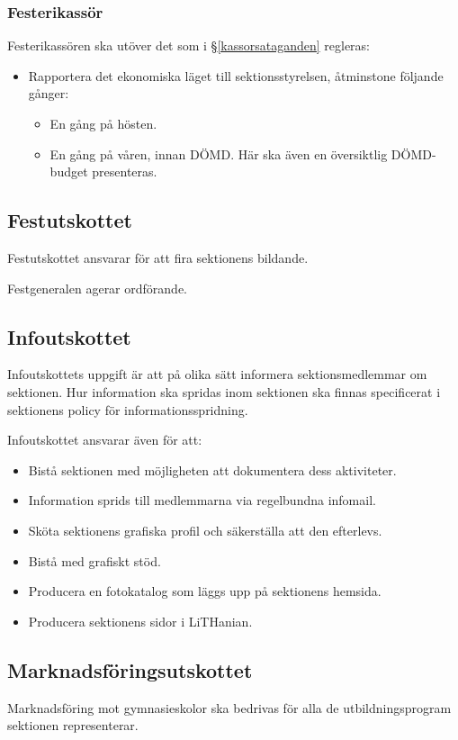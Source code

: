 \documentclass{datateknologsektionen-document}
\begin{document}
\subsubsection{Festerikassör}
Festerikassören ska utöver det som i \S \ref{kassorsataganden} regleras:
\begin{itemize}
  \item Rapportera det ekonomiska läget till sektionsstyrelsen, åtminstone följande gånger:
        \begin{itemize}
          \item En gång på hösten.
          \item En gång på våren, innan DÖMD. Här ska även en översiktlig DÖMD-budget presenteras.
        \end{itemize}
\end{itemize}

\subsection{Festutskottet}
Festutskottet ansvarar för att fira sektionens bildande.

Festgeneralen agerar ordförande.

\subsection{Infoutskottet}
\label{infoutskottet}
Infoutskottets uppgift är att på olika sätt informera sektionsmedlemmar om sektionen.
Hur information ska spridas inom sektionen ska finnas specificerat i sektionens
policy för informationsspridning.

Infoutskottet ansvarar även för att:
\begin{itemize}
  \item Bistå sektionen med möjligheten att dokumentera dess aktiviteter.
  \item Information sprids till medlemmarna via regelbundna infomail.
  \item Sköta sektionens grafiska profil och säkerställa att den efterlevs.
  \item Bistå med grafiskt stöd.
  \item Producera en fotokatalog som läggs upp på sektionens hemsida.
  \item Producera sektionens sidor i LiTHanian.
\end{itemize}

\subsection{Marknadsföringsutskottet}
Marknadsföring mot gymnasieskolor ska bedrivas för alla de utbildningsprogram sektionen representerar.
\end{document}
